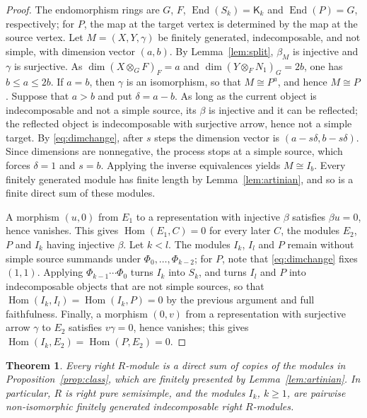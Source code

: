 \documentclass[11pt,a4paper]{amsart}
\newtheorem{theorem}{Theorem}[section]
\numberwithin{equation}{section}
\newcommand{\Hom}{\operatorname{Hom}}
\newcommand{\End}{\operatorname{End}}
\newcommand{\Ksf}{\mathsf{K}}
\begin{document}
\begin{proof}
The endomorphism rings are $G$, $F$, $\End(S_k)=\Ksf_k$ and $\End(P)=G$, respectively; for $P$, the map at the target vertex is determined by the map at the source vertex. Let $M=(X,Y,\gamma)$ be finitely generated, indecomposable, and not simple, with dimension vector $(a,b)$. By Lemma~\ref{lem:split}, $\beta_M$ is injective and $\gamma$ is surjective. As $\dim(X\otimes_GF)_F=a$ and $\dim(Y\otimes_FN_1)_G=2b$, one has $b\le a\le2b$. If $a=b$, then $\gamma$ is an isomorphism, so that $M\cong P^a$, and hence $M\cong P$. Suppose that $a>b$ and put $\delta=a-b$. As long as the current object is indecomposable and not a simple source, its $\beta$ is injective and it can be reflected; the reflected object is indecomposable with surjective arrow, hence not a simple target. By \eqref{eq:dimchange}, after $s$ steps the dimension vector is $(a-s\delta,b-s\delta)$. Since dimensions are nonnegative, the process stops at a simple source, which forces $\delta=1$ and $s=b$. Applying the inverse equivalences yields $M\cong I_b$. Every finitely generated module has finite length by Lemma~\ref{lem:artinian}, and so is a finite direct sum of these modules.

A morphism $(u,0)$ from $E_1$ to a representation with injective $\beta$ satisfies $\beta u=0$, hence vanishes. This gives $\Hom(E_1,C)=0$ for every later $C$, the modules $E_2$, $P$ and $I_k$ having injective $\beta$. Let $k<l$. The modules $I_k$, $I_l$ and $P$ remain without simple source summands under $\Phi_0,\dots,\Phi_{k-2}$; for $P$, note that \eqref{eq:dimchange} fixes $(1,1)$. Applying $\Phi_{k-1}\cdots\Phi_0$ turns $I_k$ into $S_k$, and turns $I_l$ and $P$ into indecomposable objects that are not simple sources, so that $\Hom(I_k,I_l)=\Hom(I_k,P)=0$ by the previous argument and full faithfulness. Finally, a morphism $(0,v)$ from a representation with surjective arrow $\gamma$ to $E_2$ satisfies $v\gamma=0$, hence vanishes; this gives $\Hom(I_k,E_2)=\Hom(P,E_2)=0$.
\end{proof}

\begin{theorem}\label{thm:pss}
Every right $R$-module is a direct sum of copies of the modules in Proposition~\ref{prop:class}, which are finitely presented by Lemma~\ref{lem:artinian}. In particular, $R$ is right pure semisimple, and the modules $I_k$, $k\ge1$, are pairwise non-isomorphic finitely generated indecomposable right $R$-modules.
\end{theorem}
\end{document}
